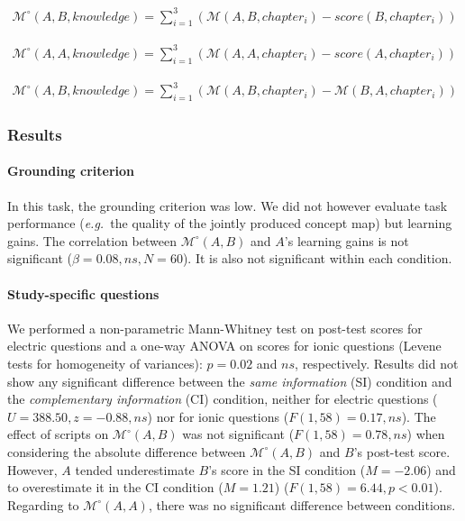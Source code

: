 \documentclass[natbib]{svjour3}
\newcommand{\eg}{{\textit{e.g.\ }}}
\newcommand{\M}[3]{{\mathcal{M}(#1, #2, #3)}}
\newcommand{\gModel}[2]{{$\mathcal{M}^{\circ}(#1, #2)$}}
\newcommand{\Mdeg}[3]{{\mathcal{M}^{\circ}(#1, #2, #3)}}
\begin{document}
\begin{multline} \label{eq:study4.1}
    \Mdeg{A}{B}{knowledge} = 
        \sum_{i=1}^{3} (\M{A}{B}{chapter_i} - score(B, chapter_i))
\end{multline}

\begin{multline} \label{eq:study4.2}
    \Mdeg{A}{A}{knowledge} = 
        \sum_{i=1}^{3}  (\M{A}{A}{chapter_i} - score(A, chapter_i))
\end{multline}

\begin{multline} \label{eq:study4.3}
    \Mdeg{A}{B}{knowledge} = 
        \sum_{i=1}^{3}  (\M{A}{B}{chapter_i} - \M{B}{A}{chapter_i})
\end{multline}

\subsubsection*{Results}

\paragraph{Grounding criterion} In this task, the grounding criterion was low.
We did not however evaluate task performance (\eg the quality of the jointly
produced concept map) but learning gains. The correlation between \gModel{A}{B}
and $A$'s learning gains is not significant ($\beta = 0.08, ns, N = 60$). It is
also not significant within each condition.

\paragraph{Study-specific questions} We performed a non-parametric Mann-Whitney
test on post-test scores for electric questions and a one-way ANOVA on scores
for ionic questions (Levene tests for homogeneity of variances): $p = 0.02$ and
$ns$, respectively. Results  did not show any significant difference between the
\emph{same information} (SI) condition and the \emph{complementary information}
(CI) condition, neither for electric questions ($U = 388.50, z = -0.88, ns$) nor
for ionic questions ($F(1, 58) = 0.17, ns$).  The effect of scripts on
\gModel{A}{B} was not significant ($F(1, 58) = 0.78, ns$) when considering the
absolute difference between \gModel{A}{B} and $B$'s post-test score. However, $A$
tended underestimate $B$'s score in the SI condition ($M = -2.06$) and to
overestimate it in the CI condition ($M = 1.21$) ($F(1, 58) = 6.44, p<0.01$).
Regarding to \gModel{A}{A}, there was no significant difference between
conditions.
\end{document}
